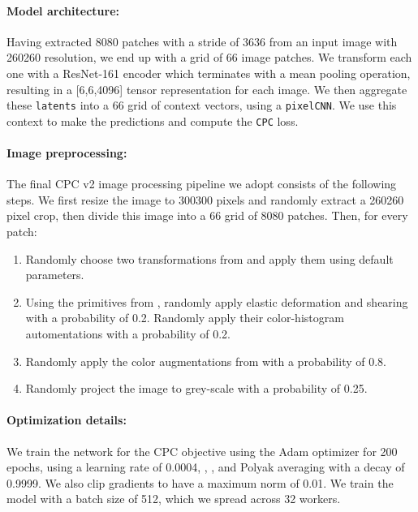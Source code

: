 \documentclass{article}
\begin{document}
\paragraph{Model architecture:} Having extracted 8080 patches with a stride of 3636 from an input image with 260260 resolution, we end up with a grid of 66 image patches. We transform each one with a ResNet-161 encoder which terminates with a mean pooling operation, resulting in a [6,6,4096] tensor representation for each image. We then aggregate these \lstinline[language=Python]{latents} into a 66 grid of context vectors, using a \lstinline[language=Python]{pixelCNN}. We use this context to make the predictions and compute the \lstinline[language=Python]{CPC} loss. 



\paragraph{Image preprocessing: } The final CPC v2 image processing pipeline we adopt consists of the following steps. We first resize the image to 300300 pixels and randomly extract a 260260 pixel crop, then divide this image into a 66 grid of 8080 patches. Then, for every patch: 
\begin{enumerate}
    \item Randomly choose two transformations from \citet{cubuk2018autoaugment} and apply them using default parameters.
    \item Using the primitives from \citet{de2018clinically}, randomly apply elastic deformation and shearing with a probability of 0.2. Randomly apply their color-histogram automentations with a probability of 0.2.
    \item Randomly apply the color augmentations from \citet{szegedy2014going} with a probability of 0.8. 
    \item Randomly project the image to grey-scale with a probability of 0.25. 
\end{enumerate}

\paragraph{Optimization details:} We train the network for the CPC objective using the Adam  optimizer \citep{kingma2014adam} for 200 epochs, using a learning rate of 0.0004, , ,  and Polyak averaging with a decay of 0.9999. We also clip gradients to have a maximum norm of 0.01. We train the model with a batch size of 512, which we spread across 32 workers. 
\end{document}
